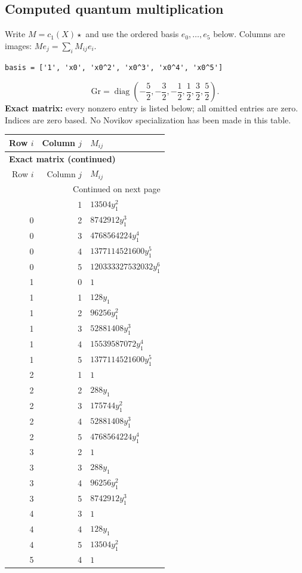 \documentclass[10pt,a4paper]{article}
\begin{document}
\subsection*{Computed quantum multiplication}
Write $M=c_1(X)\star$ and use the ordered basis $e_0,\ldots,e_{5}$ below. Columns are images: $M e_j=\sum_i M_{ij}e_i$.
\begin{lstlisting}
basis = ['1', 'x0', 'x0^2', 'x0^3', 'x0^4', 'x0^5']
\end{lstlisting}
\[\mathrm{Gr}=\operatorname{diag}\!\left(- \frac{5}{2},- \frac{3}{2},- \frac{1}{2},\frac{1}{2},\frac{3}{2},\frac{5}{2}\right).\]
\textbf{Exact matrix:} every nonzero entry is listed below; all omitted entries are zero. Indices are zero based. No Novikov specialization has been made in this table.
{\small\setlength{\tabcolsep}{7pt}\begin{longtable}{rrp{125mm}}
\toprule Row $i$ & Column $j$ & $M_{ij}$\\\midrule\endfirsthead
\multicolumn{3}{l}{\textbf{Exact matrix (continued)}}\\
\toprule Row $i$ & Column $j$ & $M_{ij}$\\\midrule\endhead
\midrule\multicolumn{3}{r}{Continued on next page}\\\endfoot\bottomrule\endlastfoot
0 & 1 & $13504 y_{1}^{2}$\\
0 & 2 & $8742912 y_{1}^{3}$\\
0 & 3 & $4768564224 y_{1}^{4}$\\
0 & 4 & $1377114521600 y_{1}^{5}$\\
0 & 5 & $120333327532032 y_{1}^{6}$\\
1 & 0 & $1$\\
1 & 1 & $128 y_{1}$\\
1 & 2 & $96256 y_{1}^{2}$\\
1 & 3 & $52881408 y_{1}^{3}$\\
1 & 4 & $15539587072 y_{1}^{4}$\\
1 & 5 & $1377114521600 y_{1}^{5}$\\
2 & 1 & $1$\\
2 & 2 & $288 y_{1}$\\
2 & 3 & $175744 y_{1}^{2}$\\
2 & 4 & $52881408 y_{1}^{3}$\\
2 & 5 & $4768564224 y_{1}^{4}$\\
3 & 2 & $1$\\
3 & 3 & $288 y_{1}$\\
3 & 4 & $96256 y_{1}^{2}$\\
3 & 5 & $8742912 y_{1}^{3}$\\
4 & 3 & $1$\\
4 & 4 & $128 y_{1}$\\
4 & 5 & $13504 y_{1}^{2}$\\
5 & 4 & $1$\\
\end{longtable}}
\end{document}
